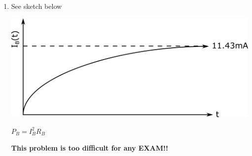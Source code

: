 {\begin{enumerate}
	$$\underline{\frac{dI}{dt}=\frac{V}{RR_BC}-\frac{I}{C} \left(\frac{1}{R}+\frac{1}{R_B}\right)}$$
	
	this has a solution $I(t)=A\exp(-t/\tau)+B$ so
	
	$$\frac{dI}{dt}=-\frac{A}{\tau}\exp(-t/\tau)$$
	
	substituting and solving for A and B we find (using) $I(0)=\frac{V}{R}$
	$$\implies A= \left(\frac{V}{R}-\frac{V}{R+R_B}\right), \: B=\left(\frac{V}{R+R_B}\right)$$
	
	$$\therefore I(t)=V\left(\frac{1}{R}-\frac{1}{R+R_B}\right)\exp(-t/\tau)+\frac{V}{R+R_B}$$
	
	$$\underline{I(t) = \frac{VR_B\exp(-t/\tau)}{R(R+R_B)}+\frac{V}{R+R_B}}$$
	
	$$\rightarrow \tau=\frac{RR_BC}{R+R_B} \textrm{ from found equation for rate of change of current.}$$
	
	Finally
	$$I_C(t)=I(t)-I_B(t),\textrm{ but } I_B(t)=\frac{V-IR}{R_B}.$$
	$$\underline{I_B(t)=\frac{V}{R_B}-\frac{R}{R_B}\left(\frac{V}{R+R_B}\left(1+R_B\exp(-t/\tau\right)\right)}$$
	
	Inserting the values $\tau=4.76ms, \: \frac{1}{\tau}=210s^{-1}$
	\vspace{5mm}
	
	$I_C(t)=240\exp(-210t)mA$
	
	$I_B(t)=11.43mA(1-\exp(-210t))$
	
	\item See sketch below
	
	\vspace{5mm}
	\includegraphics[width=0.7\linewidth]{Images/P9img3.png}
	
	
	$P_B=I_B^2R_B$
	
	\vspace{5mm}
	\textbf{\large This problem is too difficult for any EXAM!!}
\end{enumerate}
}{}